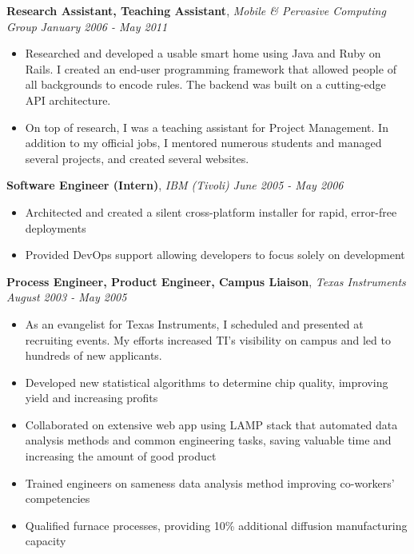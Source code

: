 \documentclass[9pt]{article}
\newenvironment{changemargin}[2]{%
  \begin{list}{}{%
    \setlength{\topsep}{0pt}%
    \setlength{\leftmargin}{#1}%
    \setlength{\rightmargin}{#2}%
    \setlength{\listparindent}{\parindent}%
    \setlength{\itemindent}{\parindent}%
    \setlength{\parsep}{\parskip}%
  }%
  \item[]}{\end{list}
}
\newcommand{\jobdescription}[1]{
	\begin{changemargin}{0.15in}{0.15in}
    \smallskip
		{#1}
    \medskip
	\end{changemargin}
}
\newcommand{\jobtitle}[3]{
	\textbf{#1}, \emph{#2} \hfill \emph{#3}\\
}
\newenvironment{body} {
	\vspace*{-16pt}
	\begin{changemargin}{-0.25in}{-0.5in}
  }	
	{\end{changemargin}
}
\begin{document}
\begin{body}
	\jobtitle{Research Assistant, Teaching Assistant}{Mobile \& Pervasive Computing Group}{January 2006 - May 2011}
  \jobdescription {
  	\begin{itemize} \itemsep -0pt  %
      \item Researched and developed a usable smart home using Java and Ruby on Rails. I created an end-user programming framework that allowed people of all backgrounds to encode rules. The backend was built on a cutting-edge API architecture. 
      \item On top of research, I was a teaching assistant for Project Management. In addition to my official jobs, I mentored numerous students and managed several projects, and created several websites.
  	\end{itemize}
  }


	\jobtitle{Software Engineer (Intern)}{IBM (Tivoli)}{June 2005 - May 2006}
  \jobdescription {
  	\begin{itemize} \itemsep -0pt
      \item Architected and created a silent cross-platform installer for rapid, error-free deployments
      \item Provided DevOps support allowing developers to focus solely on development
    \end{itemize}
  }


	\jobtitle{Process Engineer, Product Engineer, Campus Liaison}{Texas Instruments}{August 2003 - May 2005}
  \jobdescription {
  	\begin{itemize} \itemsep -0pt
      \item As an evangelist for Texas Instruments, I scheduled and presented at recruiting events. My efforts increased TI's visibility on campus and led to hundreds of new applicants.
  		\item Developed new statistical algorithms to determine chip quality, improving yield and increasing profits
  		\item Collaborated on extensive web app using LAMP stack that automated data analysis methods and common engineering tasks, saving valuable time and increasing the amount of good product
  		\item Trained engineers on sameness data analysis method improving co-workers' competencies
  		\item Qualified furnace processes, providing 10\% additional diffusion manufacturing capacity
  	\end{itemize}
  }

\end{body}
\end{document}
